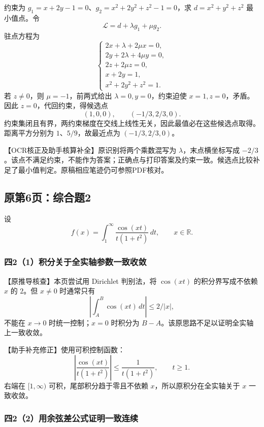\documentclass[11pt,fontset=fandol]{ctexart}
\begin{document}
约束为 \(g_1=x+2y-1=0\)、\(g_2=x^2+2y^2+z^2-1=0\)，求 \(d=x^2+y^2+z^2\)
最小值点。令 \[
\mathcal L=d+\lambda g_1+\mu g_2.
\] 驻点方程为 \[
\begin{cases}
2x+\lambda+2\mu x=0,\\
2y+2\lambda+4\mu y=0,\\
2z+2\mu z=0,\\
x+2y=1,\\
x^2+2y^2+z^2=1.
\end{cases}
\] 若 \(z\ne0\)，则 \(\mu=-1\)，前两式给出 \(\lambda=0,y=0\)，约束迫使
\(x=1,z=0\)，矛盾。因此 \(z=0\)，代回约束，得候选点 \[
(1,0,0),\qquad(-1/3,2/3,0).
\]
约束集闭且有界，两约束梯度在交线上线性无关，因此最值必在这些候选点取得。距离平方分别为
\(1\)、\(5/9\)，故最近点为 \((-1/3,2/3,0)\)。

【OCR核正及助手核算补全】原识别将两个乘数混写为
\(\lambda\)，末点横坐标写成
\(-2/3\)。该点不满足约束，不能作为答案；正确点与打印答案及约束一致。候选点比较补足了最小值判定。原稿相应笔迹仍可参照PDF核对。

\subsection{原第6页：综合题2}\label{ux539fux7b2c6ux9875ux7efcux5408ux98982}

设 \[
f(x)=\int_1^\infty\frac{\cos(xt)}{t(1+t^2)}\,dt,\qquad x\in\mathbb R.
\]

\subsubsection{四2（1）积分关于全实轴参数一致收敛}\label{ux56db21ux79efux5206ux5173ux4e8eux5168ux5b9eux8f74ux53c2ux6570ux4e00ux81f4ux6536ux655b}

【原推导核查】本页尝试用 Dirichlet 判别法，将 \(\cos(xt)\)
的积分界写成不依赖 \(x\) 的 \(2\)。但 \(x\ne0\) 时通常只有 \[
\left|\int_A^B\cos(xt)\,dt\right|\le2/|x|,
\] 不能在 \(x\to0\) 时统一控制；\(x=0\) 时积分为
\(B-A\)。该原思路不足以证明全实轴上一致收敛。

【助手补充修正】使用可积控制函数： \[
\left|\frac{\cos(xt)}{t(1+t^2)}\right|\le\frac1{t(1+t^2)},\qquad t\ge1.
\] 右端在 \([1,\infty)\) 可积，尾部积分趋于零且不依赖
\(x\)，所以原积分在全实轴关于 \(x\) 一致收敛。

\subsubsection{四2（2）用余弦差公式证明一致连续}\label{ux56db22ux7528ux4f59ux5f26ux5deeux516cux5f0fux8bc1ux660eux4e00ux81f4ux8fdeux7eed}
\end{document}
